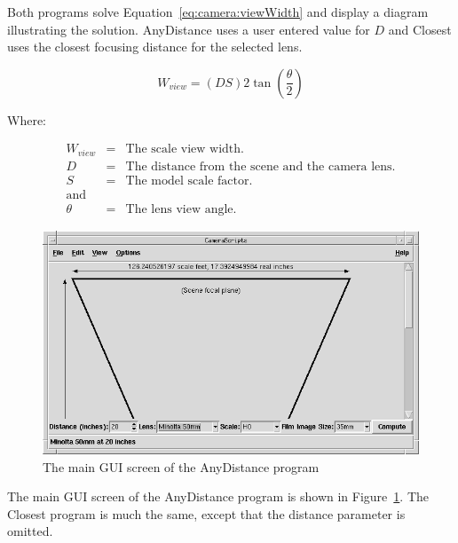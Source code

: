 Both programs solve Equation~\ref{eq:camera:viewWidth} and display a
diagram illustrating the solution.  AnyDistance uses a user entered
value for $D$ and Closest uses the closest focusing distance for the
selected lens.

\begin{equation}
W_{view} = (D S) 2 \tan(\frac{\theta}{2}) \label{eq:camera:viewWidth}
\end{equation}

Where:

\begin{eqnarray*}
W_{view} &=& \mbox{The scale view width.}\\
D &=& \mbox{The distance from the scene and the camera lens.}\\
S &=& \mbox{The model scale factor.}\\
\mbox{and} \\
\theta &=& \mbox{The lens view angle.}
\end{eqnarray*}

\begin{figure}[hbpt]
\begin{centering}
\includegraphics[width=5in]{CameraAnyDist.png}
\caption{The main GUI screen of the AnyDistance program}
\label{fig:camera:anydist}
\end{centering}
\end{figure}
The main GUI screen of the AnyDistance program is shown in
Figure~\ref{fig:camera:anydist}. The Closest program is much the same,
except that the distance parameter is omitted.
